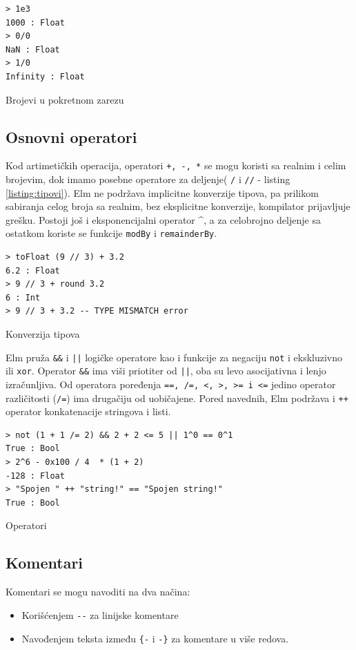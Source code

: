 \documentclass[12pt,oneside]{memoir}
\begin{document}
\begin{listing}[ht]
\begin{verbatim}
> 1e3
1000 : Float
> 0/0 
NaN : Float
> 1/0 
Infinity : Float
\end{verbatim}
\caption{Brojevi u pokretnom zarezu}
\label{listing:brojevi}
\end{listing}

\subsection{Osnovni operatori}
Kod artimetičkih operacija, operatori \texttt{+, -, *} se mogu koristi sa realnim i 
celim brojevim, dok imamo posebne operatore za deljenje( \texttt{{/}} i \texttt{{//}}
- listing \ref{listing:tipovi}). Elm ne podržava implicitne konverzije tipova, pa
prilikom sabiranja celog broja sa realnim, bez eksplicitne konverzije, kompilator
prijavljuje grešku. Postoji još i eksponencijalni operator \^{}, a za celobrojno deljenje 
sa ostatkom koriste se funkcije \texttt{modBy} i \texttt{remainderBy}.
\begin{listing}[h]
\begin{verbatim}
> toFloat (9 // 3) + 3.2
6.2 : Float
> 9 // 3 + round 3.2
6 : Int
> 9 // 3 + 3.2 -- TYPE MISMATCH error
\end{verbatim}
\caption{Konverzija tipova}
\label{konverzija}
\end{listing}

Elm pruža \texttt{\&\&} i \texttt{||} logičke operatore kao i funkcije za negaciju 
\texttt{not} i ekskluzivno ili \texttt{xor}. Operator \texttt{\&\&} ima viši priotiter 
od \texttt{||}, oba su levo asocijativna i lenjo izračunljiva. Od operatora poređenja 
\texttt{==, /=, <, >, >= i <=} jedino operator različitosti (\texttt{/=}) ima drugačiju 
od uobičajene. Pored navednih, Elm podržava i \texttt{++} operator konkatenacije 
stringova i listi.

\begin{listing}[h]
\begin{verbatim}
> not (1 + 1 /= 2) && 2 + 2 <= 5 || 1^0 == 0^1 
True : Bool
> 2^6 - 0x100 / 4  * (1 + 2)
-128 : Float
> "Spojen " ++ "string!" == "Spojen string!"
True : Bool
\end{verbatim}
\caption{Operatori}
\label{konverzija}
\end{listing}

\subsection{Komentari}
Komentari se mogu navoditi na dva načina: \begin{itemize}
  \item Korišćenjem \texttt{-{}-} za linijske komentare
  \item Navođenjem teksta između \texttt{\{-} i \texttt{-\}} za komentare u više redova.    
\end{itemize}
\end{document}
